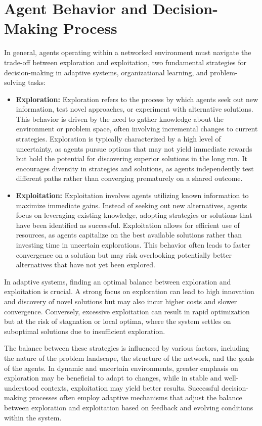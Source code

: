 \documentclass[conference]{IEEEtran}
\begin{document}
\section{Agent Behavior and Decision-Making Process}

In general, agents operating within a networked environment must navigate the trade-off between exploration and exploitation, two fundamental strategies for decision-making in adaptive systems, organizational learning, and problem-solving tasks:

\begin{itemize}
    \item \textbf{Exploration:} Exploration refers to the process by which agents seek out new information, test novel approaches, or experiment with alternative solutions. This behavior is driven by the need to gather knowledge about the environment or problem space, often involving incremental changes to current strategies. Exploration is typically characterized by a high level of uncertainty, as agents pursue options that may not yield immediate rewards but hold the potential for discovering superior solutions in the long run. It encourages diversity in strategies and solutions, as agents independently test different paths rather than converging prematurely on a shared outcome.
    \item \textbf{Exploitation:} Exploitation involves agents utilizing known information to maximize immediate gains. Instead of seeking out new alternatives, agents focus on leveraging existing knowledge, adopting strategies or solutions that have been identified as successful. Exploitation allows for efficient use of resources, as agents capitalize on the best available solutions rather than investing time in uncertain explorations. This behavior often leads to faster convergence on a solution but may risk overlooking potentially better alternatives that have not yet been explored.
\end{itemize}

In adaptive systems, finding an optimal balance between exploration and exploitation is crucial. A strong focus on exploration can lead to high innovation and discovery of novel solutions but may also incur higher costs and slower convergence. Conversely, excessive exploitation can result in rapid optimization but at the risk of stagnation or local optima, where the system settles on suboptimal solutions due to insufficient exploration.

The balance between these strategies is influenced by various factors, including the nature of the problem landscape, the structure of the network, and the goals of the agents. In dynamic and uncertain environments, greater emphasis on exploration may be beneficial to adapt to changes, while in stable and well-understood contexts, exploitation may yield better results. Successful decision-making processes often employ adaptive mechanisms that adjust the balance between exploration and exploitation based on feedback and evolving conditions within the system.
\end{document}
